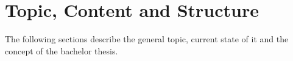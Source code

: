 \documentclass[12pt, a4paper]{article}
\begin{document}
\nocite{*}



\tableofcontents
\newpage
{}
\setcounter{lastroman}{\value{page}}

\pagestyle{plain}


\section{Topic, Content and Structure}
The following sections describe the general topic, current state of it and the concept of the bachelor thesis.
\end{document}
